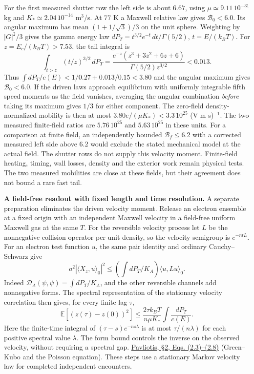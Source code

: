 \documentclass[11pt,a4paper]{article}
\begin{document}
For the first measured shutter row the left side is about \(6.67\),
using \(\mu\simeq9.11\,10^{-31}\) kg and \(K_*\simeq2.04\,10^{-14}\)
m\(^3\)/s. At \(77\) K a Maxwell relative law gives
\(\mathcal B_0<6.0\). Its angular maximum has mean \((1+1/\sqrt3)/3\) on
the unit sphere. Weighting by \(|G|^2/3\) gives the gamma energy law
\(dP_T=t^{3/2}e^{-t}\,dt/\Gamma(5/2)\), \(t=E/(k_BT)\). For
\(z=E_c/(k_BT)>7.53\), the tail integral is \[
 \int_{t>z}(t/z)^{3/2}\,dP_T
 =\frac{e^{-z}(z^3+3z^2+6z+6)}{\Gamma(5/2)z^{3/2}}<0.013 .
\] Thus \(\int dP_T/c(E)<1/0.27+0.013/0.15<3.80\) and the angular
maximum gives \(\mathcal B_0<6.0\). If the driven laws approach
equilibrium with uniformly integrable fifth speed moments as the field
vanishes, averaging the angular combination \emph{before} taking its
maximum gives \(1/3\) for either component. The zero-field
density-normalized mobility is then at most
\(3.80e/(\mu K_*)<3.3\,10^{25}\) (V m s)\(^{-1}\). The two measured
finite-field ratios are \(5.76\,10^{25}\) and \(5.63\,10^{25}\) in these
units. For a comparison at finite field, an independently bounded
\(\mathcal B_f\le6.2\) with a corrected measured left side above \(6.2\)
would exclude the stated mechanical model at the actual field. The
shutter rows do not supply this velocity moment. Finite-field heating,
timing, wall losses, density and the exterior work remain physical
tests. The two measured mobilities are close at these fields, but their
agreement does not bound a rare fast tail.

\textbf{A field-free readout with fixed length and time resolution.} A
separate preparation eliminates the driven velocity moment. Release an
electron ensemble at a fixed origin with an independent Maxwell velocity
in a field-free uniform Maxwell gas at the same \(T\). For the
reversible velocity process let \(L\) be the nonnegative collision
operator per unit density, so the velocity semigroup is \(e^{-ntL}\).
For an electron test function \(u\), the same pair identity and ordinary
Cauchy--Schwarz give \[
 a^2|\langle X_z,u\rangle_0|^2
 \le \left(\int dP_T/K_A\right)\langle u,Lu\rangle_0 .
\] Indeed \(\mathcal D_A(\psi,\psi)=\int dP_T/K_A\), and the other
reversible channels add nonnegative forms. The spectral representation
of the stationary velocity correlation then gives, for every finite lag
\(\tau\), \[
 \mathbb E[(z(\tau)-z(0))^2]
 \le \frac{2\tau k_BT}{n\mu K_*}\int\frac{dP_T}{c(E)} .
\] Here the finite-time integral of \((\tau-s)e^{-ns\lambda}\) is at
most \(\tau/(n\lambda)\) for each positive spectral value \(\lambda\).
The form bound controls the inverse on the observed velocity, without
requiring a spectral gap.
\href{../docs/Pavliotis_GreenKubo_2010.md}{Pavliotis, §2, Eqs.
(2.3)--(2.8)} (Green--Kubo and the Poisson equation). These steps use a
stationary Markov velocity law for completed independent encounters.
\end{document}
